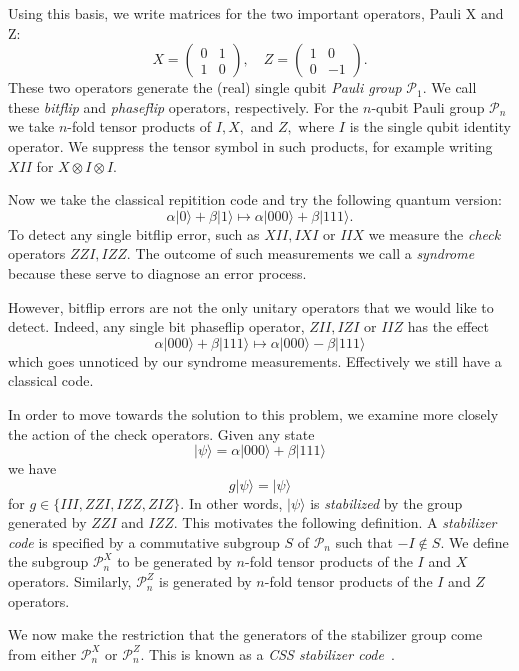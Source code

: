 \documentclass[11pt,twoside,openright]{report}
\def\Pauli{\mathcal{P}}
\newcommand{\ket}[1]{|{#1}\rangle}
\begin{document}
Using this basis, we write matrices for 
the two important operators, Pauli X and Z:
$$
X = \left( \begin{array}{ll}
0&1\\
1&0\end{array} \right),\quad
Z = \left( \begin{array}{rr}
1&0\\
0&-1\end{array} \right).
$$
These two operators generate the (real) single qubit \emph{Pauli group} $\Pauli_1.$
We call these \emph{bitflip} and \emph{phaseflip} operators, respectively.
For the $n$-qubit Pauli group $\Pauli_n$
we take $n$-fold tensor products of $I, X,$ and $Z,$
where $I$ is the single qubit identity operator.
We suppress the tensor symbol in such products, for example
writing $XII$ for $X\otimes I\otimes I.$

Now we take the classical repitition code and
try the following quantum version:
$$
    \alpha\ket{0} + \beta\ket{1} \mapsto \alpha\ket{000} + \beta\ket{111}.
$$
To detect any single bitflip error, such as
$XII, IXI$ or $IIX$ 
we measure the \emph{check} operators
$ ZZI, IZZ.$
The outcome of such measurements we call a \emph{syndrome}
because these serve to diagnose an error process.

However, bitflip errors are not the only unitary operators
that we would like to detect.
Indeed, any single bit phaseflip operator, $ZII, IZI$ or $IIZ$
has the effect
$$
    \alpha\ket{000} + \beta\ket{111} \mapsto \alpha\ket{000} - \beta\ket{111}
$$
which goes unnoticed by our syndrome measurements.
Effectively we still have a classical code.

In order to move towards the solution to this problem,
we examine more closely the action of the check operators.
Given any state 
$$
    \ket{\psi} = \alpha\ket{000} + \beta\ket{111}
$$
we have 
$$
    g \ket{\psi} = \ket{\psi}
$$
for $g \in \{III, ZZI, IZZ, ZIZ\}.$
In other words, $\ket{\psi}$ is \emph{stabilized}
by the group generated by $ZZI$ and $IZZ.$
This motivates the following definition.
A \emph{stabilizer code} is 
specified by a commutative subgroup $S$ of $\Pauli_n$
such that $-I\notin S.$
We define the subgroup $\Pauli_n^X$
to be generated by $n$-fold tensor products of the $I$ and $X$ operators.
Similarly, $\Pauli_n^Z$ 
is generated by $n$-fold tensor products of the $I$ and $Z$ operators.

We now make the restriction that the generators of
the stabilizer group come from either $\Pauli_n^X$ or $\Pauli_n^Z$.
This is known as a \emph{CSS stabilizer code}\ \cite{Gottesman1996,Calderbank1997}.
\end{document}
